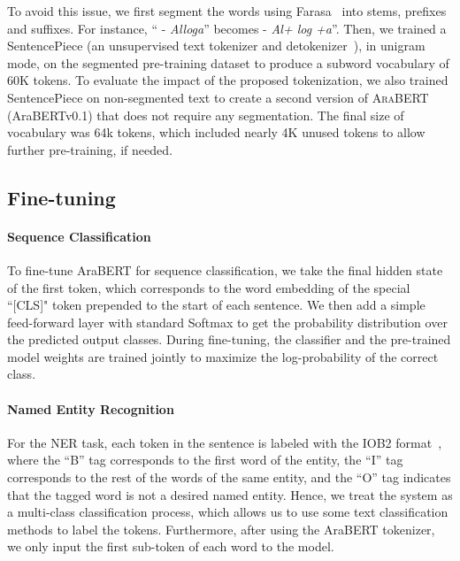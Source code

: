 \documentclass[10pt, a4paper]{article}
\begin{document}
To avoid this issue, we first segment the words using Farasa~\cite{abdelali2016farasa} into stems, prefixes and suffixes.  For instance, `` - \textit{Alloga}'' becomes  - \textit{Al+ log +a}''.  Then, we trained a SentencePiece (an unsupervised text tokenizer and detokenizer~\cite{kudo2018subword}), in unigram mode, on the segmented pre-training dataset to produce a subword vocabulary of 60K tokens.  To evaluate the impact of the proposed tokenization, we also trained SentencePiece on non-segmented text to create a second version of \textsc{AraBERT} (AraBERTv0.1) that does not require any segmentation.
The final size of vocabulary was 64k tokens, which included nearly 4K unused tokens to allow further pre-training, if needed.

\subsection{Fine-tuning}
\paragraph{Sequence Classification}
To fine-tune AraBERT for sequence classification, we take the final hidden state of the first token, which corresponds to the word embedding of the special ``[CLS]" token prepended to the start of each sentence. We then add a simple feed-forward layer with standard Softmax to get the probability distribution over the predicted output classes. During fine-tuning, the classifier and the pre-trained model weights are trained jointly to maximize the log-probability of the correct class.
\paragraph{Named Entity Recognition}
For the NER task, each token in the sentence is labeled with the IOB2 format~\cite{ratnaparkhi1998maximum}, where the ``B'' tag corresponds to the first word of the entity, the ``I'' tag corresponds to the rest of the words of the same entity, and the ``O'' tag indicates that the tagged word is not a desired named entity. Hence, we treat the system as a multi-class classification process, which allows us to use some text classification methods to label the tokens. Furthermore, after using the AraBERT tokenizer, we only input the first sub-token of each word to the model.
\end{document}
